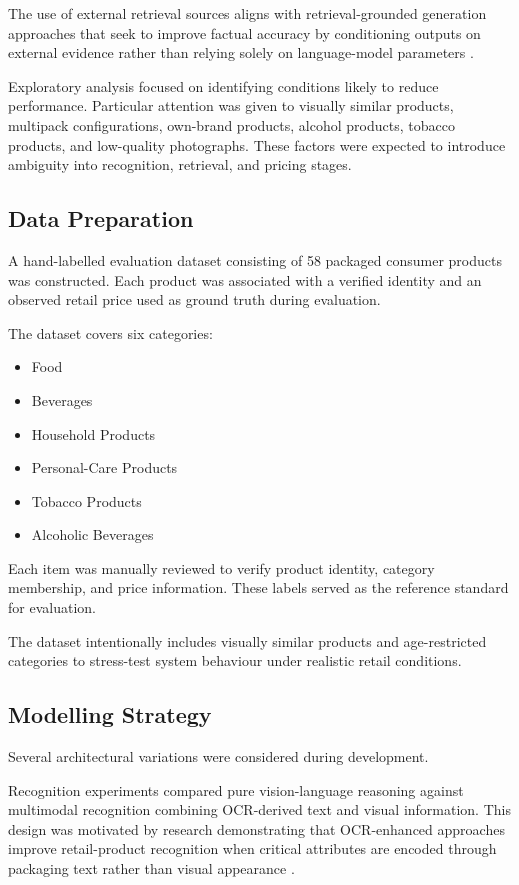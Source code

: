 \documentclass[conference]{IEEEtran}
\begin{document}
The use of external retrieval sources aligns with retrieval-grounded
generation approaches that seek to improve factual accuracy by
conditioning outputs on external evidence rather than relying solely
on language-model parameters \cite{li2024modict}.

Exploratory analysis focused on identifying conditions likely to
reduce performance. Particular attention was given to visually
similar products, multipack configurations, own-brand products,
alcohol products, tobacco products, and low-quality photographs.
These factors were expected to introduce ambiguity into recognition,
retrieval, and pricing stages.

\subsection{Data Preparation}

A hand-labelled evaluation dataset consisting of 58 packaged consumer
products was constructed. Each product was associated with a verified
identity and an observed retail price used as ground truth during
evaluation.

The dataset covers six categories:

\begin{itemize}
\item Food
\item Beverages
\item Household Products
\item Personal-Care Products
\item Tobacco Products
\item Alcoholic Beverages
\end{itemize}

Each item was manually reviewed to verify product identity,
category membership, and price information. These labels served
as the reference standard for evaluation.

The dataset intentionally includes visually similar products and
age-restricted categories to stress-test system behaviour under
realistic retail conditions.



\subsection{Modelling Strategy}
Several architectural variations were considered during development.

Recognition experiments compared pure vision-language reasoning
against multimodal recognition combining OCR-derived text and visual
information. This design was motivated by research demonstrating
that OCR-enhanced approaches improve retail-product recognition when
critical attributes are encoded through packaging text rather than
visual appearance \cite{ocrfusion2023}.
\end{document}
